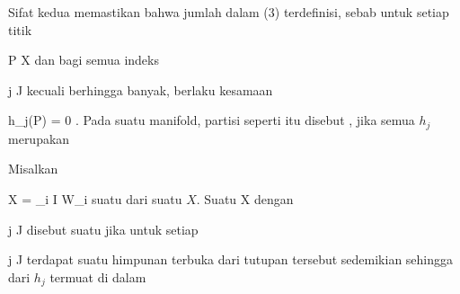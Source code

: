 Sifat kedua memastikan bahwa jumlah dalam (3) terdefinisi, sebab untuk setiap titik

\mavergleichskette
{\vergleichskette
{ P
}
{ \in }{ X
}
{  }{
}
{    }{
}
{   }{
}
}
{}{}{}
dan bagi semua indeks

\mavergleichskette
{\vergleichskette
{ j
}
{ \in }{ J
}
{  }{
}
{    }{
}
{   }{
}
}
{}{}{}
kecuali berhingga banyak, berlaku kesamaan

\mavergleichskette
{\vergleichskette
{  h_j(P)
}
{ = }{ 0
}
{  }{
}
{    }{
}
{   }{
}
}
{}{}{.}
Pada suatu manifold, partisi seperti itu disebut  {,} jika semua $h_j$ merupakan

{}
{

Misalkan

\mavergleichskette
{\vergleichskette
{ X
}
{ = }{ \bigcup_{i \in I} W_i
}
{  }{
}
{    }{
}
{   }{
}
}
{}{}{}
suatu
dari suatu
$X$. Suatu
 { X } {\R
} {}
dengan

\mavergleichskette
{\vergleichskette
{ j
}
{ \in }{ J
}
{  }{
}
{    }{
}
{   }{
}
}
{}{}{}
disebut suatu  jika untuk setiap

\mavergleichskette
{\vergleichskette
{ j
}
{ \in }{ J
}
{  }{
}
{    }{
}
{   }{
}
}
{}{}{}
terdapat suatu himpunan terbuka
 dari tutupan tersebut sedemikian sehingga
dari $h_j$ termuat di dalam

}



